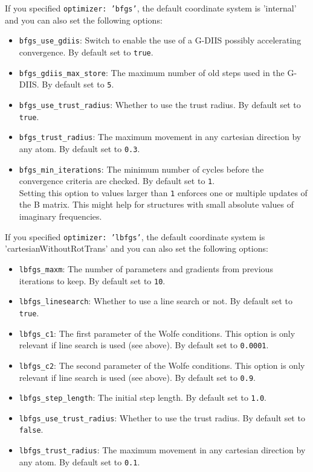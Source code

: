 \documentclass[]{tufte-book}
\begin{document}
If you specified \texttt{optimizer: 'bfgs'}, the default coordinate system is 'internal'
and you can also set the following options:
\begin{itemize}
\item \texttt{bfgs\_use\_gdiis}: Switch to enable the use of a G-DIIS possibly accelerating convergence. By default set to
\texttt{true}.
\item \texttt{bfgs\_gdiis\_max\_store}: The maximum number of old steps used in the G-DIIS. By default set to \texttt{5}.
\item \texttt{bfgs\_use\_trust\_radius}: Whether to use the trust radius. By default set to \texttt{true}.
\item \texttt{bfgs\_trust\_radius}: The maximum movement in any cartesian direction by any atom. By default set to \texttt{0.3}.
\item \texttt{bfgs\_min\_iterations}: The minimum number of cycles before the convergence criteria are checked.
By default set to \texttt{1}.\\
Setting this option to values larger than \texttt{1} enforces one or multiple updates of the B matrix.
This might help for structures with small absolute values of imaginary frequencies.
\end{itemize}

If you specified \texttt{optimizer: 'lbfgs'}, the default coordinate system is 'cartesianWithoutRotTrans'
and you can also set the following options:
\begin{itemize}
\item \texttt{lbfgs\_maxm}: The number of parameters and gradients from previous iterations to keep. By default set to
\texttt{10}.
\item \texttt{lbfgs\_linesearch}: Whether to use a line search or not. By default set to \texttt{true}.
\item \texttt{lbfgs\_c1}: The first parameter of the Wolfe conditions. This option is only relevant if line search is
used (see above). By default set to \texttt{0.0001}.
\item \texttt{lbfgs\_c2}:  The second parameter of the Wolfe conditions. This option is only relevant if line search is
used (see above). By default set to \texttt{0.9}.
\item \texttt{lbfgs\_step\_length}: The initial step length. By default set to \texttt{1.0}.
\item \texttt{lbfgs\_use\_trust\_radius}: Whether to use the trust radius. By default set to \texttt{false}.
\item \texttt{lbfgs\_trust\_radius}: The maximum movement in any cartesian direction by any atom. By default set to \texttt{0.1}.
\end{itemize}
\end{document}
